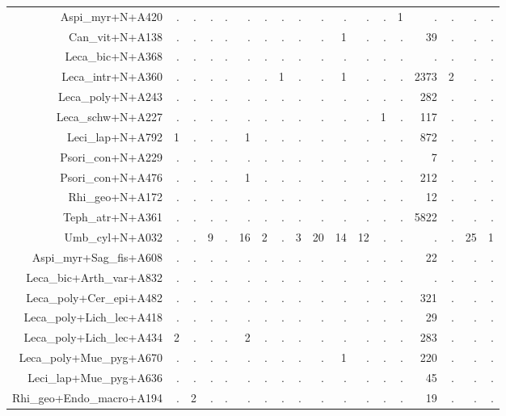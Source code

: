 \documentclass[a4paper, 11]{article}\usepackage[]{graphicx}\usepackage[]{color}
\begin{document}
\begin{table}
\begin{tabular}{rrrrrrrrrrrrrrrrrr}
  Aspi\_myr+N+A420 & . & . & . & . & . & . & . & . & . & . & . & . & 1 & . & . & . & . \\ 
  Can\_vit+N+A138 & . & . & . & . & . & . & . & . & . & 1 & . & . & . & 39 & . & . & . \\ 
  Leca\_bic+N+A368 & . & . & . & . & . & . & . & . & . & . & . & . & . & . & . & . & . \\ 
  Leca\_intr+N+A360 & . & . & . & . & . & . & 1 & . & . & 1 & . & . & . & 2373 & 2 & . & . \\ 
  Leca\_poly+N+A243 & . & . & . & . & . & . & . & . & . & . & . & . & . & 282 & . & . & . \\ 
  Leca\_schw+N+A227 & . & . & . & . & . & . & . & . & . & . & . & 1 & . & 117 & . & . & . \\ 
  Leci\_lap+N+A792 & 1 & . & . & . & 1 & . & . & . & . & . & . & . & . & 872 & . & . & . \\ 
  Psori\_con+N+A229 & . & . & . & . & . & . & . & . & . & . & . & . & . & 7 & . & . & . \\ 
  Psori\_con+N+A476 & . & . & . & . & 1 & . & . & . & . & . & . & . & . & 212 & . & . & . \\ 
  Rhi\_geo+N+A172 & . & . & . & . & . & . & . & . & . & . & . & . & . & 12 & . & . & . \\ 
  Teph\_atr+N+A361 & . & . & . & . & . & . & . & . & . & . & . & . & . & 5822 & . & . & . \\ 
  Umb\_cyl+N+A032 & . & . & 9 & . & 16 & 2 & . & 3 & 20 & 14 & 12 & . & . & . & . & 25 & 1 \\ 
  Aspi\_myr+Sag\_fis+A608 & . & . & . & . & . & . & . & . & . & . & . & . & . & 22 & . & . & . \\ 
  Leca\_bic+Arth\_var+A832 & . & . & . & . & . & . & . & . & . & . & . & . & . & . & . & . & . \\ 
  Leca\_poly+Cer\_epi+A482 & . & . & . & . & . & . & . & . & . & . & . & . & . & 321 & . & . & . \\ 
  Leca\_poly+Lich\_lec+A418 & . & . & . & . & . & . & . & . & . & . & . & . & . & 29 & . & . & . \\ 
  Leca\_poly+Lich\_lec+A434 & 2 & . & . & . & 2 & . & . & . & . & . & . & . & . & 283 & . & . & . \\ 
  Leca\_poly+Mue\_pyg+A670 & . & . & . & . & . & . & . & . & . & 1 & . & . & . & 220 & . & . & . \\ 
  Leci\_lap+Mue\_pyg+A636 & . & . & . & . & . & . & . & . & . & . & . & . & . & 45 & . & . & . \\ 
  Rhi\_geo+Endo\_macro+A194 & . & 2 & . & . & . & . & . & . & . & . & . & . & . & 19 & . & . & . \\ 

\end{tabular}
\end{table}
\end{document}
